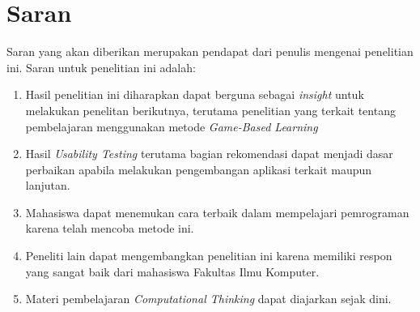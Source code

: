 \section{Saran}
Saran yang akan diberikan merupakan pendapat dari penulis mengenai penelitian ini. Saran untuk penelitian ini adalah:
\begin{enumerate}
	\item Hasil penelitian ini diharapkan dapat berguna sebagai \textit{insight} untuk melakukan penelitan berikutnya, terutama penelitian yang terkait tentang pembelajaran menggunakan metode \textit{Game-Based Learning}
	\item Hasil \textit{Usability Testing} terutama bagian rekomendasi dapat menjadi dasar perbaikan apabila melakukan pengembangan aplikasi terkait maupun lanjutan.
	\item Mahasiswa dapat menemukan cara terbaik dalam mempelajari pemrograman karena telah mencoba metode ini.
	\item Peneliti lain dapat mengembangkan penelitian ini karena memiliki respon yang sangat baik dari mahasiswa Fakultas Ilmu Komputer.
	\item Materi pembelajaran \textit{Computational Thinking} dapat diajarkan sejak dini.
\end{enumerate}

